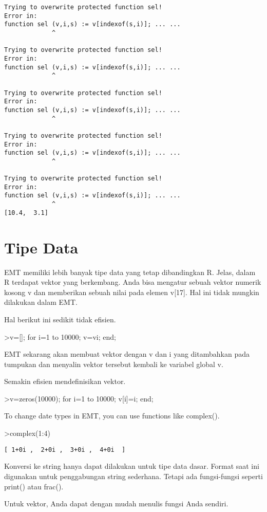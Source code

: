 \documentclass[
]{book}
\begin{document}
\begin{verbatim}
Trying to overwrite protected function sel!
Error in:
function sel (v,i,s) := v[indexof(s,i)]; ... ...
             ^

Trying to overwrite protected function sel!
Error in:
function sel (v,i,s) := v[indexof(s,i)]; ... ...
             ^

Trying to overwrite protected function sel!
Error in:
function sel (v,i,s) := v[indexof(s,i)]; ... ...
             ^

Trying to overwrite protected function sel!
Error in:
function sel (v,i,s) := v[indexof(s,i)]; ... ...
             ^

Trying to overwrite protected function sel!
Error in:
function sel (v,i,s) := v[indexof(s,i)]; ... ...
             ^
[10.4,  3.1]
\end{verbatim}

\chapter{Tipe Data}\label{tipe-data}

EMT memiliki lebih banyak tipe data yang tetap dibandingkan R. Jelas, dalam R terdapat vektor yang berkembang. Anda bisa mengatur sebuah vektor numerik kosong v dan memberikan sebuah nilai pada elemen v{[}17{]}. Hal ini tidak mungkin dilakukan dalam EMT.

Hal berikut ini sedikit tidak efisien.

\textgreater v={[}{]}; for i=1 to 10000; v=v\textbar i; end;

EMT sekarang akan membuat vektor dengan v dan i yang ditambahkan pada tumpukan dan menyalin vektor tersebut kembali ke variabel global v.

Semakin efisien mendefinisikan vektor.

\textgreater v=zeros(10000); for i=1 to 10000; v{[}i{]}=i; end;

To change date types in EMT, you can use functions like complex().

\textgreater complex(1:4)

\begin{verbatim}
[ 1+0i ,  2+0i ,  3+0i ,  4+0i  ]
\end{verbatim}

Konversi ke string hanya dapat dilakukan untuk tipe data dasar. Format saat ini digunakan untuk penggabungan string sederhana. Tetapi ada fungsi-fungsi seperti print() atau frac().

Untuk vektor, Anda dapat dengan mudah menulis fungsi Anda sendiri.
\end{document}
